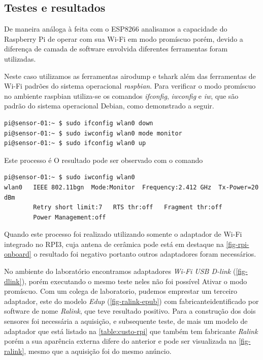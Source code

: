 \subsection{Testes e resultados}
\label{subsec:mercado-esp}

De maneira análoga à feita com o ESP8266 analisamos a capacidade do Raspberry Pi
de operar com sua Wi-Fi em modo promíscuo porém,  devido  a diferença de camada
de software envolvida diferentes ferramentas foram utilizadas.

Neste caso utilizamos as ferramentas airodump e tshark além das ferramentas de
Wi-Fi padrões do sistema operacional \emph{raspbian}. Para verificar o modo
promíscuo no ambiente raspbian utiliza-se os comandos \emph{ifconfig},
\emph{iwconfig} e \emph{iw}, que são padrão do sistema operacional Debian, como
demonstrado a seguir.

\begin{verbatim}
pi@sensor-01:~ $ sudo ifconfig wlan0 down
pi@sensor-01:~ $ sudo iwconfig wlan0 mode monitor
pi@sensor-01:~ $ sudo ifconfig wlan0 up
\end{verbatim}

Este processo é
O resultado pode ser observado com o comando

\begin{verbatim}
pi@sensor-01:~ $ sudo iwconfig wlan0
wlan0   IEEE 802.11bgn  Mode:Monitor  Frequency:2.412 GHz  Tx-Power=20 dBm
        Retry short limit:7   RTS thr:off   Fragment thr:off
        Power Management:off
\end{verbatim}

Quando este processo foi realizado utilizando somente o adaptador de Wi-Fi
integrado no RPI3, cuja antena de cerâmica pode está em destaque na
\autoref{fig-rpi-onboard} o resultado foi negativo portanto outros adaptadores
foram necessários.

No ambiente do laboratório encontramos adaptadores \emph{Wi-Fi USB D-link}
(\autoref{fig-dlink}), porém executando o mesmo teste neles não foi possível
Ativar o modo promíscuo. Com um colega de laboratorio, pudemos emprestar um
terceiro adaptador, este do modelo \emph{Edup} (\autoref{fig-ralink-epub}) com
fabricanteidentificado por software de nome \emph{Ralink}, que teve resultado
positivo. Para a construção dos dois sensores foi necessária a aquisição, e
subsequente teste, de mais um modelo de adaptador que está listado na
\autoref{table:custo-rpi} que também tem fabricante \emph{Ralink} porém a sua
aparência externa difere do anterior e pode ser visualizada na
\autoref{fig-ralink}, mesmo que a aquisição foi do mesmo anúncio.


